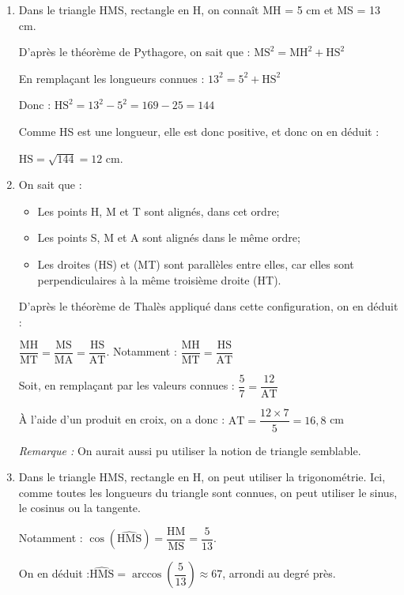 
\medskip

\begin{enumerate}
\item Dans le triangle HMS, rectangle en H, on connaît MH = 5 cm et MS = 13 cm.

D'après le théorème de Pythagore, on sait que : \qquad $\mathrm{MS}^2 = \mathrm{MH}^2 + \mathrm{HS}^2$

En remplaçant les longueurs connues : \qquad $13^2 = 5^2 + \mathrm{HS}^2$

Donc : \qquad $\mathrm{HS}^2 = 13^2 - 5^2 =169 - 25 =144 $

Comme HS est une longueur, elle est donc positive, et donc on en déduit :

$\mathrm{HS} =\sqrt{144} = 12$ cm.

\item On sait que :
\begin{itemize}[label = $ \bullet $]
	\item Les points H, M et T sont alignés, dans cet ordre;
	\item Les points S, M et A sont alignés dans le même ordre;
	\item Les droites (HS) et (MT) sont parallèles entre elles, car elles sont perpendiculaires à la même troisième droite (HT).
\end{itemize}

D'après le théorème de Thalès appliqué dans cette configuration, on en déduit :

$ \dfrac{\mathrm{MH}}{\mathrm{MT}} = \dfrac{\mathrm{MS}}{\mathrm{MA}} = \dfrac{\mathrm{HS}}{\mathrm{AT}}$.
Notamment : \qquad $ \dfrac{\mathrm{MH}}{\mathrm{MT}} = \dfrac{\mathrm{HS}}{\mathrm{AT}} $

Soit, en remplaçant par les valeurs connues : \qquad $ \dfrac{5}{7} = \dfrac{12}{\mathrm{AT}} $

À l'aide d'un produit en croix, on a donc : $\mathrm{AT} = \dfrac{12\times 7}{5} = 16,8$ cm

\emph{Remarque :} On aurait aussi pu utiliser la notion de triangle semblable.

\item Dans le triangle HMS, rectangle en H, on peut utiliser la trigonométrie. Ici, comme toutes les longueurs du triangle sont connues, on peut utiliser le sinus, le cosinus ou la tangente.

Notamment :
\qquad
$\cos \left(\widehat{\text{HMS}}\right) = \dfrac{\mathrm{HM}}{\mathrm{MS}} = \dfrac{5}{13}$.

On en déduit :\qquad $ \widehat{\text{HMS}} = \arccos\left(\dfrac{5}{13}\right) \approx 67$\textdegree, arrondi au degré près.


\end{enumerate}

